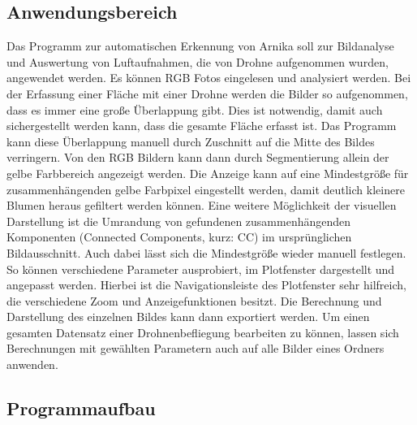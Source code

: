 \subsection{Anwendungsbereich} %
Das Programm zur automatischen Erkennung von Arnika soll zur Bildanalyse und Auswertung von Luftaufnahmen, die von Drohne aufgenommen wurden, angewendet werden. Es können RGB Fotos eingelesen und analysiert werden. Bei der Erfassung einer Fläche mit einer Drohne werden die Bilder so aufgenommen, dass es immer eine große Überlappung gibt. Dies ist notwendig, damit auch sichergestellt werden kann, dass die gesamte Fläche erfasst ist. Das Programm kann diese Überlappung manuell durch Zuschnitt auf die Mitte des Bildes verringern. Von den RGB Bildern kann dann durch Segmentierung allein der gelbe Farbbereich angezeigt werden. Die Anzeige kann auf eine Mindestgröße für zusammenhängenden gelbe Farbpixel eingestellt werden, damit deutlich kleinere Blumen heraus gefiltert werden können. Eine weitere Möglichkeit der visuellen Darstellung ist die Umrandung von gefundenen zusammenhängenden Komponenten (Connected Components, kurz: CC) im ursprünglichen Bildausschnitt. Auch dabei lässt sich die Mindestgröße wieder manuell festlegen. So können verschiedene Parameter ausprobiert, im Plotfenster dargestellt und angepasst werden. Hierbei ist die Navigationsleiste des Plotfenster sehr hilfreich, die verschiedene Zoom und Anzeigefunktionen besitzt. Die Berechnung und Darstellung des einzelnen Bildes kann dann exportiert werden. Um einen gesamten Datensatz einer Drohnenbefliegung bearbeiten zu können, lassen sich Berechnungen mit gewählten Parametern auch auf alle Bilder eines Ordners anwenden.  

\subsection{Programmaufbau}

